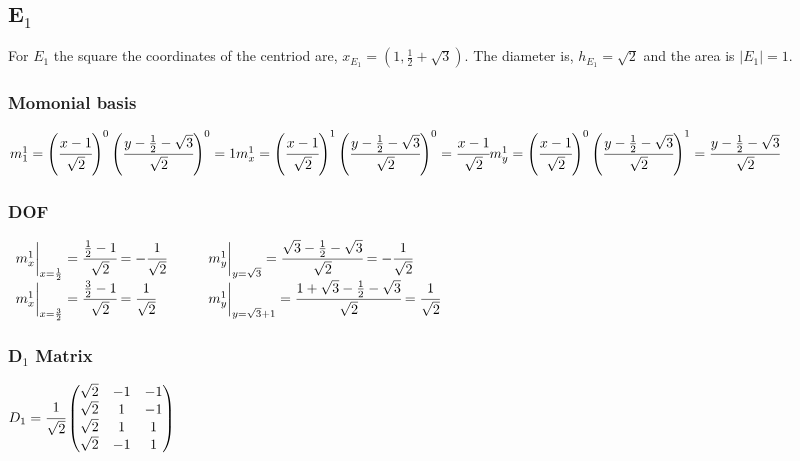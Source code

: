 \documentclass{article}
\begin{document}
\subsection{E$_1$}
For $E_1$ the square the coordinates of the centriod are, $x_{E_1} = (1, \frac{1}{2}+\sqrt{3}).$ The diameter is, $ h_{E_1} = \sqrt{2}$ and the area is $|E_1| = 1$.\\

\subsubsection{Momonial basis}
$
m_1^1 = \left(\cfrac{x - 1}{\sqrt{2}}\right)^{0}\left(\cfrac{y -\frac{1}{2} - \sqrt{3}}{\sqrt{2}}\right)^{0} = 1\\
m_x^1 = \left(\cfrac{x - 1}{\sqrt{2}}\right)^{1}\left(\cfrac{y -\frac{1}{2} - \sqrt{3}}{\sqrt{2}}\right)^{0} = \cfrac{x - 1}{\sqrt{2}}\\
m_y^1 = \left(\cfrac{x - 1}{\sqrt{2}}\right)^{0}\left(\cfrac{y -\frac{1}{2} - \sqrt{3}}{\sqrt{2}}\right)^{1} = \cfrac{y - \frac{1}{2} - \sqrt{3}}{\sqrt{2}}$\\


\subsubsection{DOF}

\(
\begin{array}{ll}
m_x^1\bigg|_{x=\frac{1}{2}} = \cfrac{\frac{1}{2} - 1}{\sqrt{2}} = -\cfrac{1}{\sqrt{2}} & \qquad m_y^1\bigg|_{y=\sqrt{3}} = \cfrac{\sqrt{3} - \frac{1}{2} - \sqrt{3}}{\sqrt{2}} = -\cfrac{1}{\sqrt{2}} \\
m_x^1\bigg|_{x=\frac{3}{2}} = \cfrac{\frac{3}{2} - 1}{\sqrt{2}} = \cfrac{1}{\sqrt{2}} & \qquad m_y^1\bigg|_{y=\sqrt{3}+1} = \cfrac{1+\sqrt{3} - \frac{1}{2} - \sqrt{3}}{\sqrt{2}} = \cfrac{1}{\sqrt{2}}
\end{array}
\)

\subsubsection{D$_1$ Matrix}
$D_1 = \cfrac{1}{\sqrt{2}}\begin{pmatrix}
    \sqrt{2} & -1 & -1\\
    \sqrt{2} & 1 & -1\\
    \sqrt{2} & 1 & 1\\
    \sqrt{2} & -1 & 1\\
\end{pmatrix}$
\end{document}
